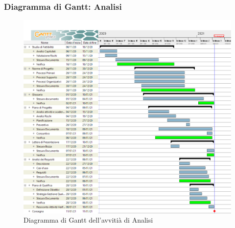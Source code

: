 \subsubsection{Diagramma di Gantt: Analisi}

\begin{figure}[ht]
    \centering
    \includegraphics[width=\textwidth]{../../Immagini/GanttAnalisi}
    \caption{Diagramma di Gantt dell'avvitià di Analisi}
\end{figure}
